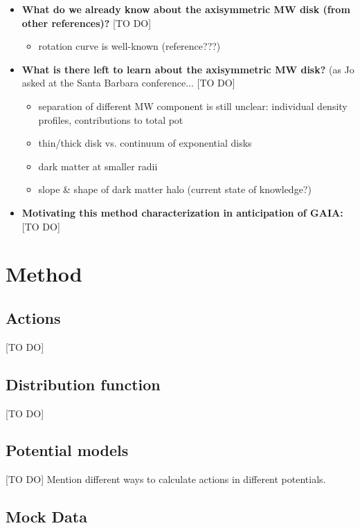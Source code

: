 \documentclass[12pt,preprint]{aastex}
\begin{document}
\begin{itemize}
\item \textbf{What do we already know about the axisymmetric MW disk (from other references)?} [TO DO]
\begin{itemize}
\item rotation curve is well-known (reference???)
\end{itemize}

\item \textbf{What is there left to learn about the axisymmetric MW disk?} (as Jo asked at the Santa Barbara conference... [TO DO]
\begin{itemize}
\item separation of different MW component is still unclear: individual density profiles, contributions to total pot
\item thin/thick disk vs. continuum of exponential disks
\item dark matter at smaller radii
\item slope \& shape of dark matter halo (current state of knowledge?)
\end{itemize} 



\item \textbf{Motivating this method characterization in anticipation of GAIA:} [TO DO]
\end{itemize}

\section{Method}

\subsection{Actions}

[TO DO]


\subsection{Distribution function}

[TO DO]

\subsection{Potential models}

[TO DO] Mention different ways to calculate actions in different potentials.

\subsection{Mock Data}
\end{document}
